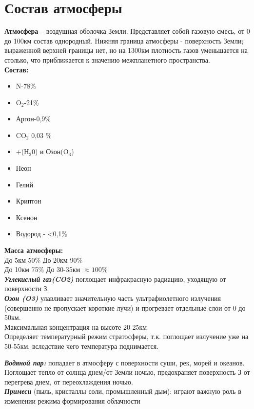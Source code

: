 
\section{Состав атмосферы}
\textbf{Атмосфера} – воздушная оболочка Земли. Представляет собой газовую смесь, от 0 до 100км состав однородный. Нижняя граница атмосферы - поверхность Земли; выраженной верхней границы нет, но на 1300км плотность газов уменьшается на столько, что приближается к значению межпланетного пространства. \\
\textbf{Состав:}
{
	\setlength{\columnseprule}{0pt}
	\begin{multicols*}{2}
		\begin{itemize}
			\item[] N-78\%
			\item[] O$_2$-21\%
			\item[] Аргон-0,9\%
			\item[] CO$_2$ 0,03 \%
			\item[] +(Н$_2$0) и Озон(O$_3$)
			\item[]	Неон
			\item[] Гелий
			\item[] Криптон
			\item[] Ксенон
			\item[] Водород - <0,1\%
		\end{itemize} 
	\end{multicols*}}
\textbf{Масса атмосферы:}\\
До 5км 50\% \hspace{7mm} До 20км	90\% \\
До 10км	75\% \hspace{6mm} До 30-35км	$\approx100$\% \\
\textbf{\textit{Углекислый газ(CO2)}} поглощает инфракрасную радиацию, уходящую от поверхности З.\\
\textbf{\textit{Озон (O3)}} улавливает значительную часть ультрафиолетного излучения (совершенно не пропускает короткие лучи) и прогревает отдельные слои от 0 до 50км.\\
Максимальная концентрация на высоте 20-25км\\
Определяет температурный режим стратосферы, т.к. поглощает излучение уже на 50-55км, вследствие чего температура поднимается.

\textit{\textbf{Водяной пар:}} попадает в атмосферу с поверхности суши, рек, морей и океанов. Поглощает тепло от солнца днем/от Земли ночью, предохраняет поверхность З от перегрева днем, от переохлаждения ночью.\\
\textit{\textbf{Примеси}} (пыль, кристаллы соли, промышленный дым): играют важную роль в изменении режима формирования облачности